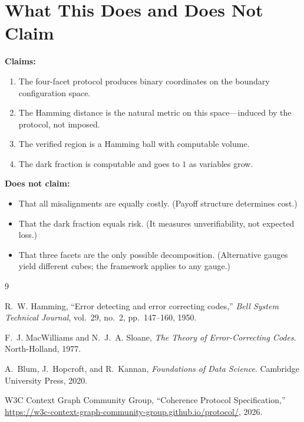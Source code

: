 \documentclass[11pt,a4paper]{article}
\begin{document}
\section{What This Does and Does Not Claim}
\label{sec:scope}

\textbf{Claims:}
\begin{enumerate}
\item The four-facet protocol produces binary coordinates on the boundary configuration space.
\item The Hamming distance is the natural metric on this space---induced by the protocol, not imposed.
\item The verified region is a Hamming ball with computable volume.
\item The dark fraction is computable and goes to $1$ as variables grow.
\end{enumerate}

\noindent\textbf{Does not claim:}
\begin{itemize}
\item That all misalignments are equally costly. (Payoff structure determines cost.)
\item That the dark fraction equals risk. (It measures unverifiability, not expected loss.)
\item That three facets are the only possible decomposition. (Alternative gauges yield different cubes; the framework applies to any gauge.)
\end{itemize}


\begin{thebibliography}{9}

R.~W. Hamming, ``Error detecting and error correcting codes,'' \emph{Bell System Technical Journal}, vol.~29, no.~2, pp.~147--160, 1950.

F.~J. MacWilliams and N.~J.~A. Sloane, \emph{The Theory of Error-Correcting Codes}. North-Holland, 1977.

A.~Blum, J.~Hopcroft, and R.~Kannan, \emph{Foundations of Data Science}. Cambridge University Press, 2020.

W3C Context Graph Community Group, ``Coherence Protocol Specification,'' \url{https://w3c-context-graph-community-group.github.io/protocol/}, 2026.

\end{thebibliography}
\end{document}
